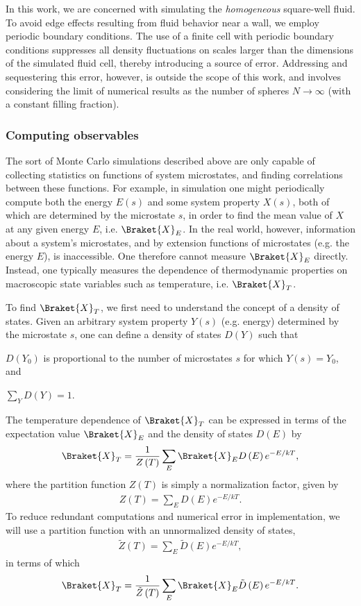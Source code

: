 \documentclass[11pt]{article}
\newcommand{\bk}{\Braket} %
\newcommand{\f}[2]{\dfrac{#1}{#2}} %
\newcommand{\p}[1]{\left(#1\right)} %
\begin{document}
In this work, we are concerned with simulating the \emph{homogeneous}
square-well fluid. To avoid edge effects resulting from fluid behavior
near a wall, we employ periodic boundary conditions. The use of a
finite cell with periodic boundary conditions suppresses all density
fluctuations on scales larger than the dimensions of the simulated
fluid cell, thereby introducing a source of error. Addressing and
sequestering this error, however, is outside the scope of this work,
and involves considering the limit of numerical results as the number
of spheres $N\to\infty$ (with a constant filling fraction).

\subsubsection{Computing observables}
\label{sec:computing_observables}

The sort of Monte Carlo simulations described above are only capable
of collecting statistics on functions of system microstates, and
finding correlations between these functions. For example, in
simulation one might periodically compute both the energy $E\p{s}$ and
some system property $X\p{s}$, both of which are determined by the
microstate $s$, in order to find the mean value of $X$ at any given
energy $E$, i.e. $\bk{X}_E$. In the real world, however, information
about a system's microstates, and by extension functions of
microstates (e.g. the energy $E$), is inaccessible. One therefore
cannot measure $\bk{X}_E$ directly. Instead, one typically measures
the dependence of thermodynamic properties on macroscopic state
variables such as temperature, i.e. $\bk{X}_T$.

To find $\bk{X}_T$, we first need to understand the concept of a
density of states. Given an arbitrary system property $Y\p{s}$
(e.g. energy) determined by the microstate $s$, one can define a
density of states $D\p{Y}$ such that
\begin{enumerate*}[label=\roman*)]
\item $D\p{Y_0}$ is proportional to the number of microstates $s$ for
  which $Y\p{s}=Y_0$, and
\item $\sum_YD\p{Y}=1$.
\end{enumerate*}
The temperature dependence of $\bk{X}_T$ can be expressed in terms of
the expectation value $\bk{X}_E$ and the density of states $D\p{E}$ by
\begin{align}
  \bk{X}_T=\f1{Z\p{T}}\sum_E\bk{X}_ED\p{E}e^{-E/kT},
  \label{eq:XT_norm}
\end{align}
where the partition function $Z\p{T}$ is simply a normalization
factor, given by
\begin{align}
  Z\p{T}=\sum_ED\p{E}e^{-E/kT}.
\end{align}
To reduce redundant computations and numerical error in
implementation, we will use a partition function with an unnormalized
density of states,
\begin{align}
  \tilde Z\p{T}=\sum_E\tilde D\p{E}e^{-E/kT},
\end{align}
in terms of which
\begin{align}
  \bk{X}_T=\f1{\tilde Z\p{T}}\sum_E\bk{X}_E\tilde D\p{E}e^{-E/kT}.
  \label{eq:XT}
\end{align}
\end{document}
